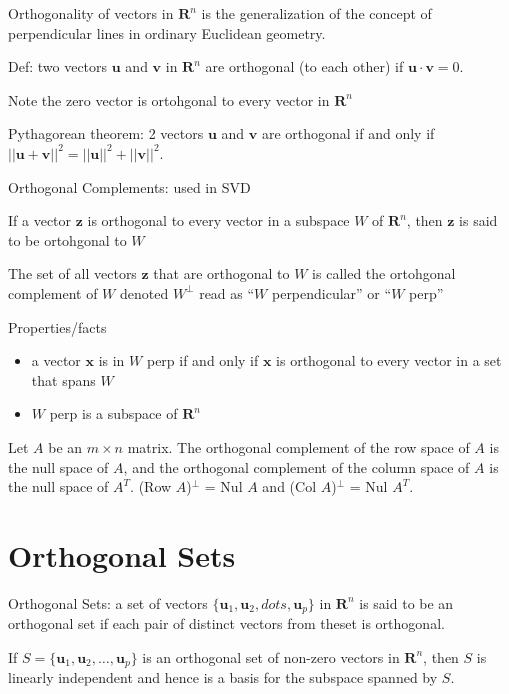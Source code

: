 \documentclass[../linalg.tex]{subfiles}
\begin{document}
Orthogonality of vectors in $\textbf{R}^n$ is the generalization of the concept of perpendicular lines in ordinary Euclidean geometry.

Def: two vectors $\textbf{u}$ and $\textbf{v}$ in $\textbf{R}^n$ are orthogonal (to each other) if $\textbf{u}\cdot \textbf{v} =0$.

Note the zero vector is ortohgonal to every vector in $\textbf{R}^n$

Pythagorean theorem: 2 vectors $\textbf{u}$ and $\textbf{v}$ are orthogonal if and only if $||\textbf{u}+\textbf{v}||^2 = ||\textbf{u}||^2 + ||\textbf{v}||^2$.

Orthogonal Complements: used in SVD 

If a vector $\textbf{z}$ is orthogonal to every vector in a subspace $W$ of $\textbf{R}^n$, then $\textbf{z}$ is said to be ortohgonal to $W$

The set of all vectors $\textbf{z}$ that are orthogonal to $W$ is called the ortohgonal complement of $W$ denoted $W^{\perp}$ read as ``$W$ perpendicular'' or ``$W$ perp''

Properties/facts 
\begin{itemize}
    \item a vector $\textbf{x}$ is in $W$ perp if and only if $\textbf{x}$ is orthogonal to every vector in a set that spans $W$
    \item $W$ perp is a subspace of $\textbf{R}^n$
\end{itemize}

\begin{theorem}
    Let $A$ be an $m\times n$ matrix. The orthogonal complement of the row space of $A$ is the null space of $A$, and the orthogonal complement of the column space of $A$ is the null space of $A^T$.
    (Row $A$)$^{\perp}$ = Nul $A$ and (Col $A$)$^{\perp}$ = Nul $A^T$.    
\end{theorem}

\section{Orthogonal Sets}
Orthogonal Sets: a set of vectors $\{\textbf{u}_1,\textbf{u}_2,dots,\textbf{u}_p\}$ in $\textbf{R}^n$ is said to be an orthogonal set if each pair of distinct vectors from theset is orthogonal.
\begin{theorem}
    If $S=\{\textbf{u}_1,\textbf{u}_2,\dots,\textbf{u}_p\}$ is an orthogonal set of non-zero vectors in $\textbf{R}^n$, then $S$ is linearly independent and hence is a basis for the subspace spanned by $S$.
\end{theorem}
\end{document}
